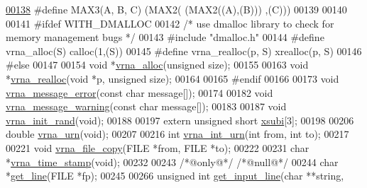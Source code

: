 \begin{DoxyCode}
\hypertarget{utils_8h_source_l00138}{}\hyperlink{group__utils_ga8d577123d2e66d2b7d0bf9af6e172b93}{00138} \textcolor{preprocessor}{#define MAX3(A, B, C)   (MAX2(  (MAX2((A),(B))) ,(C)))}
00139 
00140 
00141 \textcolor{preprocessor}{#ifdef WITH\_DMALLOC}
00142 \textcolor{comment}{/* use dmalloc library to check for memory management bugs */}
00143 \textcolor{preprocessor}{#include "dmalloc.h"}
00144 \textcolor{preprocessor}{#define vrna\_alloc(S)       calloc(1,(S))}
00145 \textcolor{preprocessor}{#define vrna\_realloc(p, S)  xrealloc(p, S)}
00146 \textcolor{preprocessor}{#else}
00147 
00154 \textcolor{keywordtype}{void}  *\hyperlink{group__utils_gaf37a0979367c977edfb9da6614eebe99}{vrna\_alloc}(\textcolor{keywordtype}{unsigned} size);
00155 
00163 \textcolor{keywordtype}{void}  *\hyperlink{group__utils_ga27f4719a66c6f90d1cca3d1e6e696c6a}{vrna\_realloc}(\textcolor{keywordtype}{void} *p, \textcolor{keywordtype}{unsigned} size);
00164 
00165 \textcolor{preprocessor}{#endif}
00166 
00173 \textcolor{keywordtype}{void} \hyperlink{group__utils_gabb76f8f8dbd652fa4a24037cf4524373}{vrna\_message\_error}(\textcolor{keyword}{const} \textcolor{keywordtype}{char} message[]);
00174 
00182 \textcolor{keywordtype}{void} \hyperlink{group__utils_gafe4072406bd287c6857763dd7d2fe1f1}{vrna\_message\_warning}(\textcolor{keyword}{const} \textcolor{keywordtype}{char} message[]);
00183 
00187 \textcolor{keywordtype}{void} \hyperlink{group__utils_ga0ad1f40ea316e5c5918695c35613027a}{vrna\_init\_rand}(\textcolor{keywordtype}{void});
00188 
00197 \textcolor{keyword}{extern} \textcolor{keywordtype}{unsigned} \textcolor{keywordtype}{short} \hyperlink{group__utils_gaf9a866c8417afda7368bbac939ab3c47}{xsubi}[3];
00198 
00206 \textcolor{keywordtype}{double} \hyperlink{group__utils_ga384e256ebb295d04a14426179db0dd6e}{vrna\_urn}(\textcolor{keywordtype}{void});
00207 
00216 \textcolor{keywordtype}{int} \hyperlink{group__utils_ga46111bb3747dbcf4609f0d40ae169ad9}{vrna\_int\_urn}(\textcolor{keywordtype}{int} from, \textcolor{keywordtype}{int} to);
00217 
00221 \textcolor{keywordtype}{void} \hyperlink{group__utils_ga4382a56d2fee9ed738364b99329edc7c}{vrna\_file\_copy}(FILE *from, FILE *to);
00222 
00231 \textcolor{keywordtype}{char}  *\hyperlink{group__utils_gad3bbe8d01afb1310609cb018d5290550}{vrna\_time\_stamp}(\textcolor{keywordtype}{void});
00232 
00243 \textcolor{comment}{/*@only@*/} \textcolor{comment}{/*@null@*/}
00244 \textcolor{keywordtype}{char}  *\hyperlink{group__utils_gabe51806d14cff0789a8c1df7dbc45b71}{get\_line}(FILE *fp);
00245 
00266 \textcolor{keywordtype}{unsigned} \textcolor{keywordtype}{int} \hyperlink{group__utils_ga8ef1835eb83f542396f59f0b205965e5}{get\_input\_line}(\textcolor{keywordtype}{char} **\textcolor{keywordtype}{string},

\end{DoxyCode}
